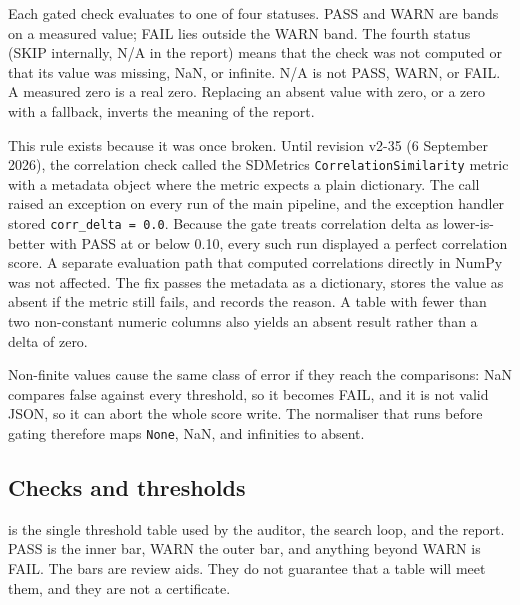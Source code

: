 \documentclass[11pt,a4paper]{article}
\begin{document}
Each gated check evaluates to one of four statuses. PASS and WARN are bands on a measured value; FAIL lies outside the WARN band. The fourth status (SKIP internally, N/A in the report) means that the check was not computed or that its value was missing, NaN, or infinite. N/A is not PASS, WARN, or FAIL. A measured zero is a real zero. Replacing an absent value with zero, or a zero with a fallback, inverts the meaning of the report.

This rule exists because it was once broken. Until revision v2-35 (6 September 2026), the correlation check called the SDMetrics \texttt{CorrelationSimilarity} metric with a metadata object where the metric expects a plain dictionary. The call raised an exception on every run of the main pipeline, and the exception handler stored \texttt{corr\_delta = 0.0}. Because the gate treats correlation delta as lower-is-better with PASS at or below 0.10, every such run displayed a perfect correlation score. A separate evaluation path that computed correlations directly in NumPy was not affected. The fix passes the metadata as a dictionary, stores the value as absent if the metric still fails, and records the reason. A table with fewer than two non-constant numeric columns also yields an absent result rather than a delta of zero.

Non-finite values cause the same class of error if they reach the comparisons: NaN compares false against every threshold, so it becomes FAIL, and it is not valid JSON, so it can abort the whole score write. The normaliser that runs before gating therefore maps \texttt{None}, NaN, and infinities to absent.

\subsection{Checks and thresholds}\label{sec:checks}

 is the single threshold table used by the auditor, the search loop, and the report. PASS is the inner bar, WARN the outer bar, and anything beyond WARN is FAIL. The bars are review aids. They do not guarantee that a table will meet them, and they are not a certificate.
\end{document}
